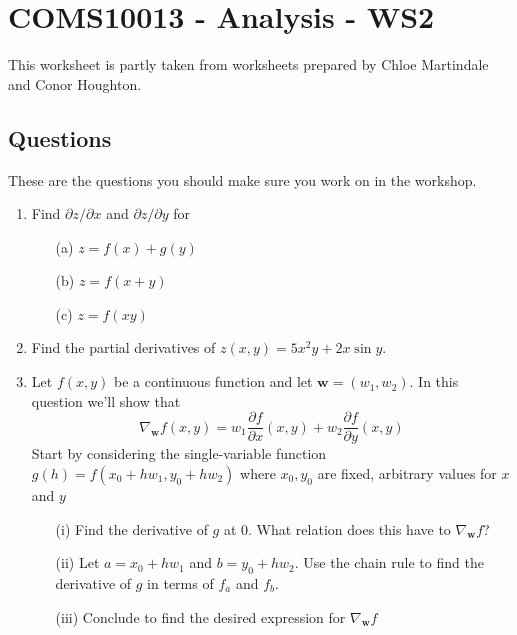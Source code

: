 \documentclass[11pt,a4paper]{scrartcl}
\begin{document}
\section*{COMS10013 - Analysis - WS2}
This worksheet is partly taken from worksheets prepared by Chloe Martindale and Conor Houghton.

\subsection*{Questions}

These are the questions you should make sure you work on in the workshop.

\begin{enumerate}

\item Find $\partial z/\partial x$ and $\partial z/\partial y$ for 
\begin{enumerate}
    \item[(a)] $z = f(x) +g(y)$
    \item[(b)] $z = f(x+y)$
    \item[(c)] $z = f(xy)$
\end{enumerate}

\item Find the partial derivatives of $z(x,y)=5x^2y+2x\sin{y}$.

\item Let $f(x,y)$ be a continuous function and let $\mathbf{w} = (w_1,w_2)$. 
In this question we'll show that 
\[
\nabla_\mathbf{w}f(x,y) = w_1 \frac{\partial f}{\partial x}(x,y) + w_2 \frac{\partial f}{\partial y}(x,y)
\]
Start by considering the single-variable function $g(h) = f(x_0 + hw_1, y_0 + hw_2)$ where $x_0, y_0$ are fixed, arbitrary values for $x$ and $y$
\begin{enumerate}
    \item[(i)]  Find the derivative of $g$ at 0.  What relation does this have to $\nabla_{\mathbf{w}}f$?
    \item[(ii)]  Let $a = x_0 + hw_1$ and $b = y_0 + hw_2$. Use the chain rule to find the derivative of $g$ in terms of $f_a$ and $f_b$.
    \item[(iii)] Conclude to find the desired expression for $\nabla_{\mathbf{w}}f$
\end{enumerate}


\end{enumerate}
\end{document}
